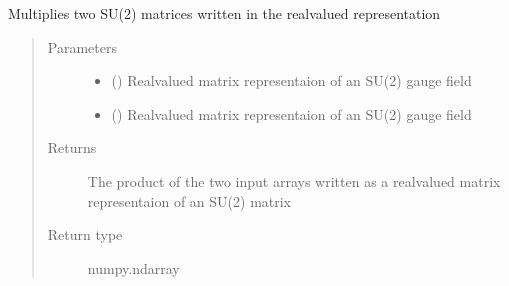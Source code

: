 \documentclass[letterpaper,10pt,english]{sphinxmanual}
\begin{document}
\begin{fulllineitems}
\label{\detokenize{index:su2.mult}}
Multiplies two SU(2) matrices written in the real\sphinxhyphen{}valued
representation
\begin{quote}\begin{description}
\item[{Parameters}] \leavevmode\begin{itemize}
\item {} 
 () \textendash{} Real\sphinxhyphen{}valued matrix representaion of an SU(2) gauge field

\item {} 
 () \textendash{} Real\sphinxhyphen{}valued matrix representaion of an SU(2) gauge field

\end{itemize}

\item[{Returns}] \leavevmode
The product of the two input arrays written as a real\sphinxhyphen{}valued
matrix representaion of an SU(2) matrix

\item[{Return type}] \leavevmode
numpy.ndarray

\end{description}\end{quote}

\end{fulllineitems}

\end{document}
